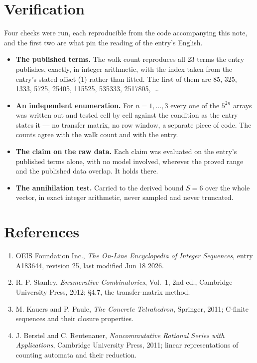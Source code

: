 \documentclass[11pt]{article}
\theoremstyle{definition}
\begin{document}
\section{Verification}

Four checks were run, each reproducible from the code accompanying this note, and the first two are what pin the reading of the entry's English.

\begin{itemize}

\item {\bfseries The published terms.} The walk count reproduces all 23 terms the entry publishes, exactly, in integer arithmetic, with the index taken from the entry's stated offset (1) rather than fitted. The first of them are 85, 325, 1333, 5725, 25405, 115525, 535333, 2517805,~\dots

\item {\bfseries An independent enumeration.} For $n = 1,\dots,3$ every one of the $5^{2n}$ arrays was written out and tested cell by cell against the condition as the entry states it --- no transfer matrix, no row window, a separate piece of code. The counts agree with the walk count and with the entry.

\item {\bfseries The claim on the raw data.} Each claim was evaluated on the entry's published terms alone, with no model involved, wherever the proved range and the published data overlap. It holds there.

\item {\bfseries The annihilation test.} Carried to the derived bound $S = 6$ over the whole vector, in exact integer arithmetic, never sampled and never truncated.

\end{itemize}

\section{References}

\begin{enumerate}

\item OEIS Foundation Inc., \emph{The On-Line Encyclopedia of Integer Sequences}, entry \href{https://oeis.org/A183644}{A183644}, revision 25, last modified Jun 18 2026.

\item R. P. Stanley, \emph{Enumerative Combinatorics}, Vol.~1, 2nd ed., Cambridge University Press, 2012; \S4.7, the transfer-matrix method.

\item M. Kauers and P. Paule, \emph{The Concrete Tetrahedron}, Springer, 2011; C-finite sequences and their closure properties.

\item J. Berstel and C. Reutenauer, \emph{Noncommutative Rational Series with Applications}, Cambridge University Press, 2011; linear representations of counting automata and their reduction.

\end{enumerate}
\end{document}
